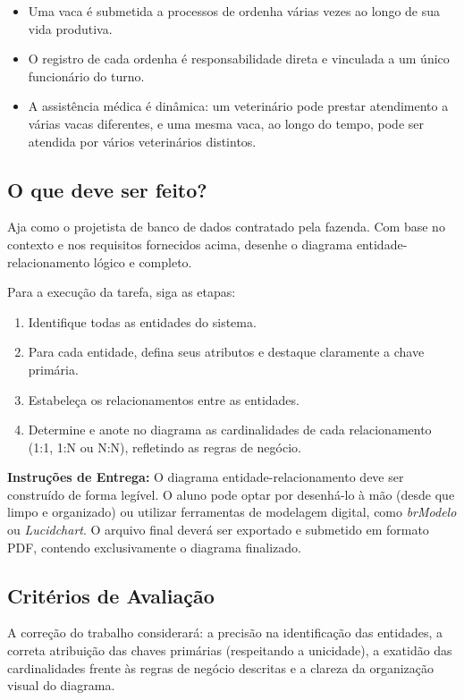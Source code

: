 \begin{itemize}
    \item Uma vaca é submetida a processos de ordenha várias vezes ao longo de sua vida produtiva.
    \item O registro de cada ordenha é responsabilidade direta e vinculada a um único funcionário do turno.
    \item A assistência médica é dinâmica: um veterinário pode prestar atendimento a várias vacas diferentes, e uma mesma vaca, ao longo do tempo, pode ser atendida por vários veterinários distintos.
\end{itemize}

\subsection{O que deve ser feito?}

Aja como o projetista de banco de dados contratado pela fazenda. Com base no contexto e nos requisitos fornecidos acima, desenhe o diagrama entidade-relacionamento lógico e completo.

Para a execução da tarefa, siga as etapas:
\begin{enumerate}
    \item Identifique todas as entidades do sistema.
    \item Para cada entidade, defina seus atributos e destaque claramente a chave primária.
    \item Estabeleça os relacionamentos entre as entidades.
    \item Determine e anote no diagrama as cardinalidades de cada relacionamento (1:1, 1:N ou N:N), refletindo as regras de negócio.
\end{enumerate}

\begin{observacao}
\textbf{Instruções de Entrega:}
O diagrama entidade-relacionamento deve ser construído de forma legível. O aluno pode optar por desenhá-lo à mão (desde que limpo e organizado) ou utilizar ferramentas de modelagem digital, como \textit{brModelo} ou \textit{Lucidchart}. O arquivo final deverá ser exportado e submetido em formato PDF, contendo exclusivamente o diagrama finalizado.
\end{observacao}

\subsection{Critérios de Avaliação}
A correção do trabalho considerará: a precisão na identificação das entidades, a correta atribuição das chaves primárias (respeitando a unicidade), a exatidão das cardinalidades frente às regras de negócio descritas e a clareza da organização visual do diagrama.

